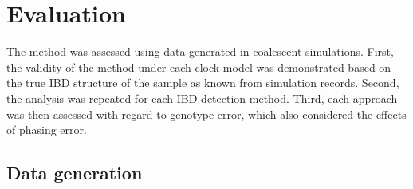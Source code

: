 %
%
%


%
\section{Evaluation}
%

The method was assessed using data generated in coalescent simulations.
First, the validity of the method under each clock model was demonstrated based on the true IBD structure of the sample as known from simulation records.
Second, the analysis was repeated for each IBD detection method.
Third, each approach was then assessed with regard to genotype error, which also considered the effects of phasing error.


%
\subsection{Data generation}
%

